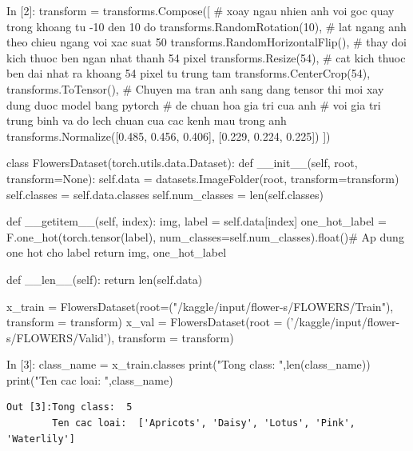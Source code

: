 \documentclass[12pt, a4paper]{article}
\begin{document}
\begin{python}
In [2]: transform = transforms.Compose([
                 #  xoay ngau nhien anh voi goc quay trong khoang tu -10 den 10 do
                transforms.RandomRotation(10), 
                #  lat ngang anh theo chieu ngang voi xac suat 50%
                transforms.RandomHorizontalFlip(), 
                 # thay doi kich thuoc ben ngan nhat thanh 54 pixel
                transforms.Resize(54),     
                 # cat kich thuoc ben dai nhat ra khoang 54 pixel tu trung tam 
                transforms.CenterCrop(54),       
                transforms.ToTensor(), # Chuyen ma tran anh sang dang tensor thi moi xay dung duoc model bang pytorch
                # de chuan hoa gia tri cua anh
                # voi gia tri trung binh va do lech chuan cua cac kenh mau trong anh
                transforms.Normalize([0.485, 0.456, 0.406],   
                                     [0.229, 0.224, 0.225])
        ])
        
        class FlowersDataset(torch.utils.data.Dataset):
            def __init__(self, root, transform=None):
                self.data = datasets.ImageFolder(root, transform=transform)
                self.classes = self.data.classes
                self.num_classes = len(self.classes)
        
            def __getitem__(self, index):
                img, label = self.data[index]
                one_hot_label = F.one_hot(torch.tensor(label), num_classes=self.num_classes).float()# Ap dung one hot cho label
                return img, one_hot_label
        
            def __len__(self):
                return len(self.data)
            
            
        x_train = FlowersDataset(root=("/kaggle/input/flower-s/FLOWERS/Train"), transform = transform)
        x_val = FlowersDataset(root = ('/kaggle/input/flower-s/FLOWERS/Valid'), transform = transform)
\end{python}

\begin{python}
In [3]: class_name = x_train.classes
        print("Tong class: ",len(class_name))
        print("Ten cac loai: ",class_name)
\end{python}

\begin{verbatim}
Out [3]:Tong class:  5
        Ten cac loai:  ['Apricots', 'Daisy', 'Lotus', 'Pink', 'Waterlily']
\end{verbatim}
\end{document}
